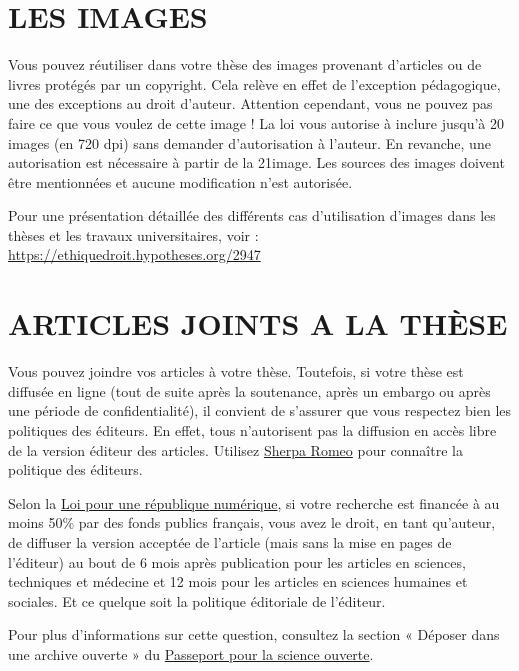 \documentclass[main=french,a4paper]{book}
\begin{document}
\section{LES IMAGES}
Vous pouvez réutiliser dans votre thèse des images provenant d’articles ou de livres protégés par un copyright. Cela relève en effet de l’exception pédagogique, une des exceptions au droit d’auteur. Attention cependant, vous ne pouvez pas faire ce que vous voulez de cette image ! La loi vous autorise à inclure jusqu’à 20 images (en 720 dpi) sans demander d’autorisation à l’auteur. En revanche, une autorisation est nécessaire à partir de la 21\ieme image. Les sources des images doivent être mentionnées et aucune modification n’est autorisée.\\ \par
Pour une présentation détaillée des différents cas d’utilisation d’images dans les thèses et les travaux universitaires, voir : \url{https://ethiquedroit.hypotheses.org/2947}
\section{ARTICLES JOINTS A LA THÈSE}
Vous pouvez joindre vos articles à votre thèse. Toutefois, si votre thèse est diffusée en ligne (tout de suite après la soutenance, après un embargo ou après une période de confidentialité), il convient de s’assurer que vous respectez bien les politiques des éditeurs. En effet, tous n’autorisent pas la diffusion en accès libre de la version éditeur des articles. Utilisez \href{https://v2.sherpa.ac.uk/romeo/}{Sherpa Romeo} pour connaître la politique des éditeurs. \\ \par
Selon la \href{https://www.legifrance.gouv.fr/dossierlegislatif/JORFDOLE000031589829/}{Loi pour une république numérique}, si votre recherche est financée à au moins 50\% par des fonds publics français, vous avez le droit, en tant qu’auteur, de diffuser la version acceptée de l’article (mais sans la mise en pages de l’éditeur) au bout de 6 mois après publication pour les articles en sciences, techniques et médecine et 12 mois pour les articles en sciences humaines et sociales. Et ce quelque soit la politique éditoriale de l’éditeur.\\ \par
Pour plus d’informations sur cette question, consultez la section « Déposer dans une archive ouverte » du \href{https://www.ouvrirlascience.fr/wp-content/uploads/2021/09/Passeport-pour-la-science-ouverte-Guide-a-lusage-des-doctorants_10-09-2021_WEB_FR.pdf}{Passeport pour la science ouverte}.
\end{document}
